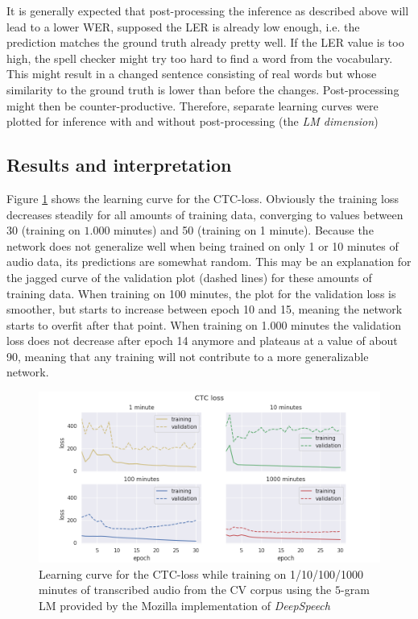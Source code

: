 It is generally expected that post-processing the inference as described above will lead to a lower \ac{WER}, supposed the \ac{LER} is already low enough, i.e. the prediction matches the ground truth already pretty well. If the \ac{LER} value is too high, the spell checker might try too hard to find a word from the vocabulary. This might result in a changed sentence consisting of real words but whose similarity to the ground truth is lower than before the changes. Post-processing might then be counter-productive. Therefore, separate learning curves were plotted for inference with and without post-processing (the \textit{\ac{LM} dimension})

\subsection{Results and interpretation}

Figure \ref{lc_loss_cv} shows the learning curve for the \ac{CTC}-loss. Obviously the training loss decreases steadily for all amounts of training data, converging to values between 30 (training on $1.000$ minutes) and 50 (training on 1 minute). Because the network does not generalize well when being trained on only 1 or 10 minutes of audio data, its predictions are somewhat random. This may be an explanation for the jagged curve of the validation plot (dashed lines) for these amounts of training data. When training on 100 minutes, the plot for the validation loss is smoother, but starts to increase between epoch 10 and 15, meaning the network starts to overfit after that point. When training on 1.000 minutes the validation loss does not decrease after epoch 14 anymore and plateaus at a value of about 90, meaning that any training will not contribute to a more generalizable network.

\begin{figure}[h!]
	\includegraphics[width=\linewidth]{./img/lc_loss_cv.png}
	\caption{Learning curve for the CTC-loss while training on 1/10/100/1000 minutes of transcribed audio from the \ac{CV} corpus using the $5$-gram \ac{LM} provided by the Mozilla implementation of \textit{DeepSpeech}}
	\label{lc_loss_cv}
\end{figure}

